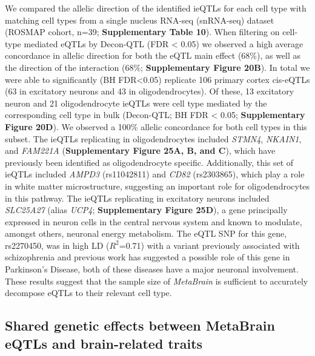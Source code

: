 We compared the allelic direction of the identified ieQTLs for each cell type with matching cell types from a single nucleus RNA-seq (snRNA-seq) dataset (ROSMAP cohort, n=39; \textbf{Supplementary Table 10})\cite{mathysSinglecellTranscriptomicAnalysis2019}. When filtering on cell-type mediated eQTLs by Decon-QTL (FDR < 0.05) we observed a high average concordance in allelic direction for both the eQTL main effect (68\%), as well as the direction of the interaction (68\%; \textbf{Supplementary Figure 20B}). In total we were able to significantly (BH FDR<0.05) replicate 106 primary cortex cis-eQTLs (63 in excitatory neurons and 43 in oligodendrocytes). Of these, 13 excitatory neuron and 21 oligodendrocyte ieQTLs were cell type mediated by the corresponding cell type in bulk (Decon-QTL; BH FDR < 0.05; \textbf{Supplementary Figure 20D}). We observed a 100\% allelic concordance for both cell types in this subset. The ieQTLs replicating in oligodendrocytes included \emph{STMN4}, \emph{NKAIN1}, and \emph{FAM221A} (\textbf{Supplementary Figure 25A, B, and C}), which have previously been identified as oligodendrocyte specific\cite{ngUsingTranscriptomicHidden2019}. Additionally, this set of ieQTLs included \emph{AMPD3} (rs11042811) and \emph{CD82} (rs2303865), which play a role in white matter microstructure\cite{zhaoLargescaleGWASReveals2019}, suggesting an important role for oligodendrocytes in this pathway. The ieQTLs replicating in excitatory neurons included \emph{SLC25A27} (alias \emph{UCP4}; \textbf{Supplementary Figure 25D}), a gene principally expressed in neuron cells\cite{smorodchenkoComparativeAnalysisUncoupling2009} in the central nervous system\cite{ramsdenHumanNeuronalUncoupling2012} and known to modulate, amongst others, neuronal energy metabolism\cite{liuMitochondrialUCP4Mediates2006}. The eQTL SNP for this gene, rs2270450, was in high LD ($R^2$=0.71) with a variant previously associated with schizophrenia\cite{yasunoSynergisticAssociationMitochondrial2007} and previous work has suggested a possible role of this gene in Parkinson’s Disease\cite{ramsdenHumanNeuronalUncoupling2012,hoMitochondrialNeuronalUncoupling2012}, both of these diseases have a major neuronal involvement. These results suggest that the sample size of \emph{MetaBrain} is sufficient to accurately decompose eQTLs to their relevant cell type. 

\subsection{Shared genetic effects between MetaBrain eQTLs and brain-related traits}
	
